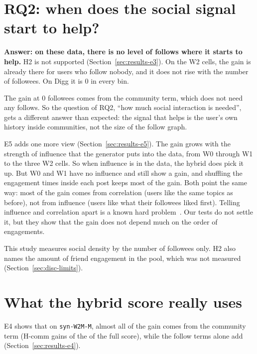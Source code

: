 \section{RQ2: when does the social signal start to help?}
\label{sec:disc-rq2}

\textbf{Answer: on these data, there is no level of follows where it starts to help.} H2 is not supported (Section~\ref{sec:results-e3}). On the W2 cells, the gain is already there for users who follow nobody, and it does not rise with the number of followees. On Digg it is 0 in every bin.

The gain at 0 followees comes from the community term, which does not need any follows. So the question of RQ2, ``how much social interaction is needed'', gets a different answer than expected: the signal that helps is the user's own history inside communities, not the size of the follow graph.

E5 adds one more view (Section~\ref{sec:results-e5}). The gain grows with the strength of influence that the generator puts into the data, from W0 through W1 to the three W2 cells. So when influence is in the data, the hybrid does pick it up. But W0 and W1 have no influence and still show a gain, and shuffling the engagement times inside each post keeps most of the gain. Both point the same way: most of the gain comes from correlation (users like the same topics as before), not from influence (users like what their followees liked first). Telling influence and correlation apart is a known hard problem~. Our tests do not settle it, but they show that the gain does not depend much on the order of engagements.

This study measures social density by the number of followees only. H2 also names the amount of friend engagement in the pool, which was not measured (Section~\ref{sec:disc-limits}).

\section{What the hybrid score really uses}
\label{sec:disc-hybrid}

E4 shows that on \texttt{syn-W2M-M}, almost all of the gain comes from the community term (H-comm gains \eFourWTwoMNdcgHCommTenAllGain{} of the \eFourWTwoMNdcgHTenAllGain{} of the full score), while the follow terms alone add \eFourWTwoMNdcgHFollowTenAllGain{} (Section~\ref{sec:results-e4}).

